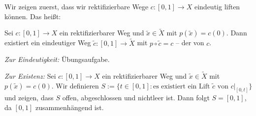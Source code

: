 \begin{beweis}
	Wir zeigen zuerst, dass wir rektifizierbare Wege $c \colon [0,1] \rightarrow X$ eindeutig liften können. Das heißt:
	
	Sei $c \colon [0,1] \rightarrow X$ ein rektifizierbarer Weg und $\tilde{x} \in \tilde{X}$ mit $p(\tilde{x}) = c(0)$.
	Dann existiert ein eindeutiger Weg $\tilde{c} \colon [0,1] \rightarrow \tilde{X}$ mit $p \circ \tilde{c} = c$ -- der  von $c$.

	\textit{Zur Eindeutigkeit:} Übungsaufgabe.
	
	\textit{Zur Existenz:} Sei $c \colon [0,1] \rightarrow X$ ein rektifizierbarer Weg und $\tilde{x} \in \tilde{X}$ mit $p(\tilde{x}) = c(0)$.
	Wir definieren $S:= \{t \in [0,1] : \text{es existiert ein Lift } \tilde{c} \text{ von } c\big|_{[0,t]}\}$ und zeigen, dass $S$ offen, abgeschlossen und nichtleer ist.
	Dann folgt $S = [0,1]$, da $[0,1]$ zusammenhängend ist.
	

\end{beweis}
